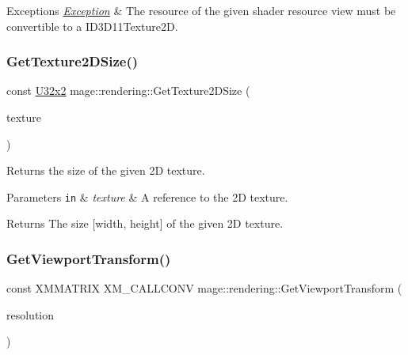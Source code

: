 \begin{DoxyExceptions}{Exceptions}
{\em \mbox{\hyperlink{classmage_1_1_exception}{Exception}}} & The resource of the given shader resource view must be convertible to a {\ttfamily I\+D3\+D11\+Texture2D}. \\
\hline
\end{DoxyExceptions}
\mbox{\label{namespacemage_1_1rendering_adc5168157e810238c5748766cd03dde9}} 
\subsubsection{\texorpdfstring{Get\+Texture2\+D\+Size()}{GetTexture2DSize()}\hspace{0.1cm}{\footnotesize\ttfamily [2/2]}}
{\footnotesize\ttfamily const \mbox{\hyperlink{namespacemage_a31f2bb52b5080e706e1c13de07c0a249}{U32x2}} mage\+::rendering\+::\+Get\+Texture2\+D\+Size (\begin{DoxyParamCaption}\item[{I\+D3\+D11\+Texture2D \&}]{texture }\end{DoxyParamCaption})\hspace{0.3cm}{\ttfamily [noexcept]}}

Returns the size of the given 2D texture.


\begin{DoxyParams}[1]{Parameters}
\mbox{\tt in}  & {\em texture} & A reference to the 2D texture. \\
\hline
\end{DoxyParams}
\begin{DoxyReturn}{Returns}
The size \mbox{[}width, height\mbox{]} of the given 2D texture. 
\end{DoxyReturn}
\mbox{\label{namespacemage_1_1rendering_a82d538281695508a371a9a0cd039d782}} 
\subsubsection{\texorpdfstring{Get\+Viewport\+Transform()}{GetViewportTransform()}}
{\footnotesize\ttfamily const X\+M\+M\+A\+T\+R\+IX X\+M\+\_\+\+C\+A\+L\+L\+C\+O\+NV mage\+::rendering\+::\+Get\+Viewport\+Transform (\begin{DoxyParamCaption}\item[{const \mbox{\hyperlink{namespacemage_a31f2bb52b5080e706e1c13de07c0a249}{U32x2}} \&}]{resolution }\end{DoxyParamCaption})\hspace{0.3cm}{\ttfamily [noexcept]}}

